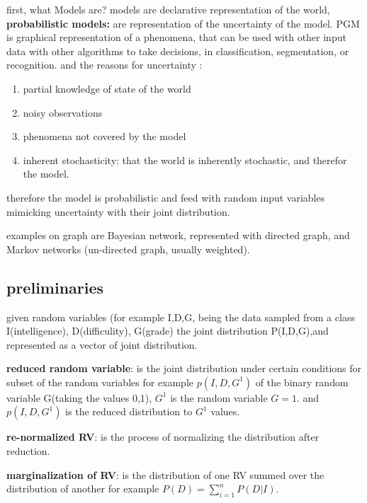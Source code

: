\documentclass[4apaper,12pt]{book}
\begin{document}
  \begin{description}
  \item first, what Models are? models are declarative representation of the world, \textbf{probabilistic models:} are representation of the uncertainty of the model. PGM is graphical representation of a phenomena, that can be used with other input data with other algorithms to take decisions, in classification, segmentation, or  recognition. and the reasons for uncertainty : \begin{enumerate}
  \item partial knowledge of state of the world
  \item noisy observations
  \item phenomena not covered by the model
    \item inherent stochasticity: that the world is inherently stochastic, and therefor the model.
  \end{enumerate}
  \item therefore the model is probabilistic and feed with random input variables mimicking uncertainty with their joint distribution.
  \item examples on graph are Bayesian network, represented with directed graph, and Markov networks (un-directed graph, usually weighted).
    \subsection{preliminaries}
    \begin{description}
    \item given random variables (for example I,D,G, being the data sampled from a class I(intelligence), D(difficulity), G(grade) the joint distribution P(I,D,G),and represented as a vector of joint distribution.
    \item \textbf{reduced random variable}: is the joint distribution under certain conditions for subset of the random variables for example $p(I,D,G^1)$ of the binary random variable G(taking the values 0,1), $G^1$ is the random variable $G=1$. and $p(I,D,G^1)$ is the reduced distribution to $G^1$ values.
    \item \textbf{re-normalized RV}: is the process of normalizing the distribution after reduction.
    \item \textbf{marginalization of RV}: is the distribution of one RV summed over the distribution of another for example $P(D)=\sum_{i=1}^nP(D|I)$.

\end{description}
\end{description}
\end{document}

